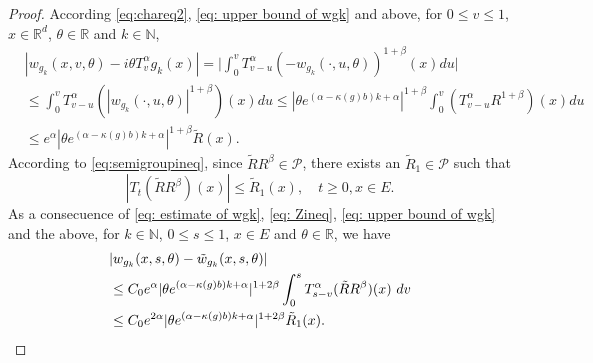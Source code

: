 \documentclass[12pt, a4paper]{amsart}
\theoremstyle{definition}
\numberwithin{equation}{section}
\begin{document}
\begin{proof}
    According \eqref{eq:chareq2}, \eqref{eq: upper bound of wgk} and above, for $0\leq v \leq 1$, $x\in \mathbb{R}^d$, $\theta \in \mathbb{R}$ and $k \in \mathbb N$,
\begin{align}
\label{eq: Zineq}
   &|w_{g_{k}}(x,v,\theta)-i\theta T_v^{\alpha}g_k(x)|
   =\Big| \int_0^v T^{\alpha}_{v-u}(-w_{g_k}(\cdot,u,\theta))^{1+\beta}(x)du\Big| 
   \\&\leq \int_0^v T_{v-u}^{\alpha}(|w_{g_k}(\cdot,u,\theta)|^{1+\beta})(x)du
   \leq  |\theta e^{(\alpha-\kappa(g)b)k+\alpha}|^{1+\beta}\int_0^v (T_{v-u}^{\alpha}R^{1+\beta})(x)du
   \\&\leq e^{\alpha}|\theta e^{(\alpha-\kappa(g)b)k+\alpha}|^{1+\beta}\tilde R(x).
\end{align}
    According to \eqref{eq:semigroupineq}, since $\tilde RR^{\beta} \in \mathcal P$, there exists an $\tilde R_1\in \mathcal P$ such that
\[
    |T_t(\tilde RR^{\beta})(x)| 
    \leq \tilde R_1(x),
    \quad t\geq0, x\in E.
\]
As a consecuence of \eqref{eq: estimate of wgk}, \eqref{eq: Zineq}, \eqref{eq: upper bound of wgk} and the above, for $k \in \mathbb{N}$, $0\leq s \leq 1$, $x\in E$ and $\theta \in \mathbb R$, we have
\begin{align}
    &|w_{g_k}(x,s,\theta)-\tilde{w}_{g_k}(x,s,\theta)|
    \\&\leq C_0e^{\alpha}|\theta e^{(\alpha-\kappa(g)b)k+\alpha}|^{1+2\beta} \int_0^s T_{s-v}^{\alpha}( \tilde RR^{\beta})(x)~dv
    \\&\leq C_0e^{2\alpha}|\theta e^{(\alpha-\kappa(g)b)k+\alpha}|^{1+2\beta}\tilde R_1(x).
    \qedhere
\end{align}
\end{proof}
\end{document}
